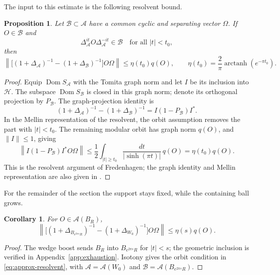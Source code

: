 \documentclass[a4paper,11pt]{article}
\newtheorem{corollary}[theorem]{Corollary}
\newtheorem{proposition}[theorem]{Proposition}
\theoremstyle{definition}
\begin{document}
The input to this estimate is the following resolvent bound.
\begin{proposition}
Let $\mathcal B\subset\mathcal A$ have a common cyclic and separating vector $\Omega$. If $O\in\mathcal B$ and
\[
 \Delta_\mathcal A^{it}O\Delta_\mathcal A^{-it}\in\mathcal B
 \quad\text{for all }|t|<t_0,
\]
then
\begin{equation}
 \left\|\bigl[(1+\Delta_\mathcal A)^{-1}
 -(1+\Delta_\mathcal B)^{-1}\bigr]O\Omega\right\|
 \leq\eta(t_0)q(O),
 \qquad \eta(t_0)=\frac2\pi\operatorname{arctanh}(e^{-\pi t_0}).
 \label{eq:approx-resolvent}
\end{equation}
\end{proposition}
\begin{proof}
Equip $\operatorname{Dom}S_\mathcal A$ with the Tomita graph norm and let $I$ be its inclusion into $\mathcal H$. The subspace $\operatorname{Dom}S_\mathcal B$ is closed in this graph norm; denote its orthogonal projection by $P_\mathcal B$. The graph-projection identity is
\[
 (1+\Delta_\mathcal A)^{-1}-(1+\Delta_\mathcal B)^{-1}
 =I(1-P_\mathcal B)I^*.
\]
In the Mellin representation of the resolvent, the orbit assumption removes the part with $|t|<t_0$. The remaining modular orbit has graph norm $q(O)$, and $\|I\|\leq1$, giving
\[
 \left\|I(1-P_\mathcal B)I^*O\Omega\right\|
 \leq\frac12\int_{|t|\geq t_0}\frac{dt}{|\sinh(\pi t)|}\,q(O)
 =\eta(t_0)q(O).
\]
This is the resolvent argument of Fredenhagen; the graph identity and Mellin representation are also given in \cite[Section~3]{Hollands2019Edge}.
\end{proof}

For the remainder of the section the support stays fixed, while the containing ball grows.
\begin{corollary}
For $O\in\mathcal A(B_R)$,
\begin{equation}
 \left\|\bigl[(1+\Delta_{B_{e^{2\pi s}R}})^{-1}
 -(1+\Delta_{W_0})^{-1}\bigr]O\Omega\right\|
 \leq\eta(s)q(O).
 \label{eq:approx-growing-resolvent}
\end{equation}
\end{corollary}
\begin{proof}
The wedge boost sends $B_R$ into $B_{e^{2\pi s}R}$ for $|t|<s$; the geometric inclusion is verified in Appendix~\ref{app:exhaustion}. Isotony gives the orbit condition in \eqref{eq:approx-resolvent}, with $\mathcal A=\mathcal A(W_0)$ and $\mathcal B=\mathcal A(B_{e^{2\pi s}R})$.
\end{proof}
\end{document}
